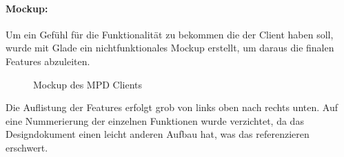 \paragraph{Mockup:}
Um ein Gefühl für die Funktionalität zu bekommen die der Client haben soll, wurde mit Glade ein nichtfunktionales Mockup erstellt, 
um daraus die finalen Features abzuleiten. 

\begin{figure}[h!]
    \caption{Mockup des MPD Clients}
    \label{p_mockup}
\end{figure}

Die Auflistung der Features erfolgt grob von links oben nach rechts unten. Auf eine Nummerierung der einzelnen Funktionen
wurde verzichtet, da das Designdokument einen leicht anderen Aufbau hat, was das referenzieren erschwert. 

